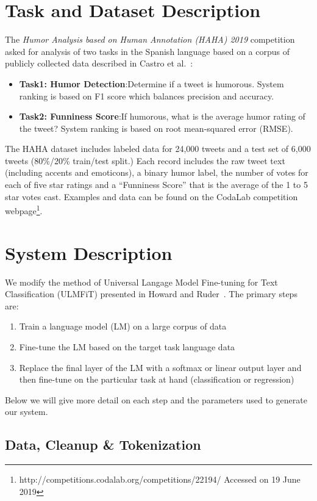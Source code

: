 \documentclass[runningheads]{llncs}
\begin{document}
\section{Task and Dataset Description}
\label{sec:task}
The \textit{Humor Analysis based on Human Annotation (HAHA) 2019}\cite{overview_haha2019} competition asked for analysis of two tasks in the Spanish language based on a corpus of publicly collected data described in Castro et al.~\cite{castro2018crowd}:
\begin{itemize}
\item \textbf{Task1: Humor Detection}:Determine if a tweet is humorous. System ranking is based on F1 score which balances precision and accuracy.
\item \textbf{Task2: Funniness Score}:If humorous, what is the average humor rating of the tweet? System ranking is based on root mean-squared error (RMSE).
\end{itemize}
The HAHA dataset includes labeled data for 24,000 tweets and a test set of 6,000 tweets (80\%/20\% train/test split.)  Each record includes the raw tweet text (including accents and emoticons), a binary humor label, the number of votes for each of five star ratings and a ``Funniness Score'' that is the average of the 1 to 5 star votes cast.  Examples and data can be found on the CodaLab competition webpage\footnote{http://competitions.codalab.org/competitions/22194/ Accessed on 19 June 2019}.

\section{System Description}
\label{sec:system}
We modify the method of Universal Langage Model Fine-tuning for Text Classification (ULMFiT) presented in Howard and Ruder~\cite{HowardRuder:DBLP:journals/corr/abs-1801-06146}.  The primary steps are: 
\begin{enumerate}
	\item Train a language model (LM) on a large corpus of data
	\item Fine-tune the LM based on the target task language data
	\item Replace the final layer of the LM with a softmax or linear output layer and then fine-tune on the particular task at hand (classification or regression)
\end{enumerate}
Below we will give more detail on each step and the parameters used to generate our system.
\subsection{Data, Cleanup \& Tokenization}
\label{sec:datacleaning}
\end{document}
